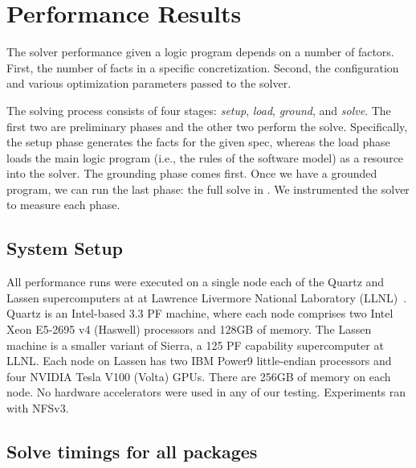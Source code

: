\section{Performance Results}
\label{sec:perf-results}


The \clingo{} solver performance given a logic program depends on a number of factors.
First, the number of facts in a specific concretization. Second, the configuration and
various optimization parameters passed to the solver.

The solving process consists of four stages: \emph{setup}, \emph{load}, \emph{ground},
and \emph{solve}. The first two are preliminary phases and the other two perform the
solve. Specifically, the setup phase generates the facts for the given spec,
whereas the load phase loads the main logic program (i.e., the rules of the
software model) as a resource into the solver. The grounding phase comes first. Once we
have a grounded program, we can run the last phase: the full solve in \clingo{}.
%
We instrumented the solver to measure each phase.

% 

% 



\subsection{System Setup}

All performance runs were executed on a single node each of the Quartz and Lassen
supercomputers at at Lawrence Livermore National Laboratory (LLNL)~\cite{llnl:hpc}.
Quartz is an Intel-based 3.3 PF machine, where each node comprises two Intel Xeon
E5-2695 v4 (Haswell) processors and 128GB of memory. The Lassen machine is a smaller
variant of Sierra, a 125 PF capability supercomputer at LLNL. Each node on Lassen has
two IBM Power9 little-endian processors and four NVIDIA Tesla V100 (Volta) GPUs. There
are 256GB of memory on each node. No hardware accelerators were used in any of our
testing. Experiments ran with NFSv3.

\subsection{Solve timings for all packages}

